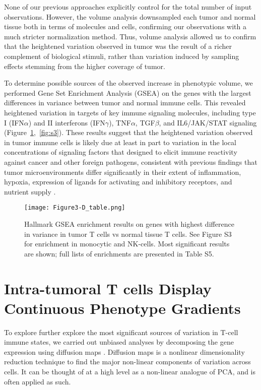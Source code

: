 None of our previous approaches explicitly control for the total number of input observations. 
However, the volume analysis downsampled each tumor and normal tissue both in terms of molecules and cells, confirming our observations with a much stricter normalization method. 
Thus, volume analysis allowed us to confirm that the heightened variation observed in tumor was the result of a richer complement of biological stimuli, rather than variation induced by sampling effects stemming from the higher coverage of tumor. 

To determine possible sources of the observed increase in phenotypic volume, we performed Gene Set Enrichment Analysis (GSEA) \citep{Subramanian2005} on the genes with the largest differences in variance between tumor and normal immune cells. 
This revealed heightened variation in targets of key immune signaling molecules, including type I (IFN$\alpha$) and II interferons (IFN$\gamma$), TNF$\alpha$, TGF$\beta$, and IL6/JAK/STAT signaling (Figure~\ref{fig:3d},~\ref{fig:s3}). %
These results suggest that the heightened variation observed in tumor immune cells is likely due at least in part to variation in the local concentrations of signaling factors that designed to elicit immune reactivity against cancer and other foreign pathogens, consistent with previous findings that tumor microenvironments differ significantly in their extent of inflammation, hypoxia, expression of ligands for activating and inhibitory receptors, and nutrient supply \citep{Finger2010,Jimenez-Sanchez2017}.

\begin{figure}
\centering
\texttt{[image: Figure3-D\_table.png]}
\caption{Hallmark GSEA enrichment results on genes with highest difference in variance in tumor T cells vs normal tissue T cells.
  See Figure S3 for enrichment in monocytic and NK-cells.
  Most significant results are shown; full lists of enrichments are presented in Table S5. %
}
\label{fig:3d}
\end{figure}

\section{Intra-tumoral T cells Display Continuous Phenotype Gradients}

To explore further explore the most significant sources of variation in T-cell immune states, we carried out unbiased analyses by decomposing the gene expression using diffusion maps \citep{Coifman2005,Haghverdi2015,Haghverdi2016,Moignard2015,Setty2016}.
Diffusion maps is a nonlinear dimensionality reduction technique to find the major non-linear components of variation across cells.
It can be thought of at a high level as a non-linear analogue of PCA, and is often applied as such. %

